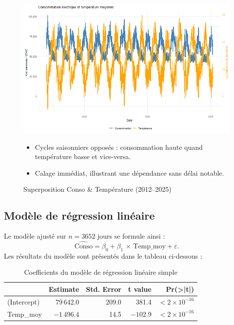 \documentclass[12pt,a4paper]{article}
\begin{document}
\begin{figure}[H]
  \centering
  \begin{minipage}[t]{0.5\textwidth}
    \centering
    \includegraphics[width=\linewidth]{Projet_partie_A/conso_vs_temp_superpose.png}
    \caption{Superposition Conso & Température (2012–2025)}
    \label{fig:timeseries_conso_temp}
  \end{minipage}
  \hfill
  \begin{minipage}[t]{0.48\textwidth}
    \small
    \begin{itemize}
      \item Cycles saisonniers opposés : consommation haute quand température basse et vice-versa.  
      \item Calage immédiat, illustrant une dépendance sans délai notable.  
    \end{itemize}
  \end{minipage}
\end{figure}

\subsection{Modèle de régression linéaire}
Le modèle ajusté sur $n = 3652$ jours se formule ainsi :
\[
\widehat{\text{Conso}}
= \beta_0 + \beta_1\,\times\,\text{Temp\_moy} + \varepsilon.
\]
Les résultats du modèle sont présentés dans le tableau ci‑dessous :

\begin{table}[H]
  \centering
  \begin{tabular}{lrrrr}
    \toprule
                 & \textbf{Estimate} & \textbf{Std. Error} & \textbf{t value} & \textbf{Pr(>|t|)} \\
    \midrule
    (Intercept)  & 79\,642.0         & 209.0               & 381.4            & $<2\times10^{-16}$ \\
    Temp\_moy    & $-1\,496.4$       & 14.5                & $-102.9$         & $<2\times10^{-16}$ \\
    \bottomrule
  \end{tabular}
  \caption{Coefficients du modèle de régression linéaire simple}
  \label{tab:reglin}
\end{table}
\end{document}

